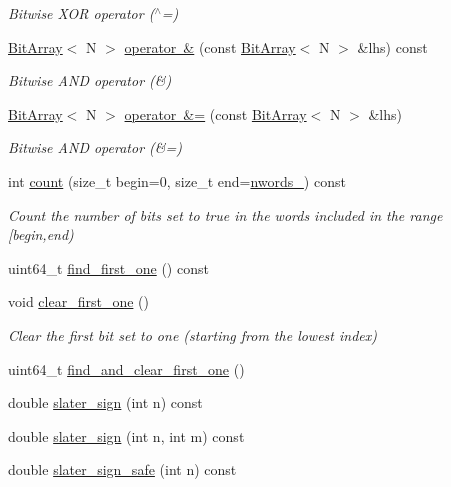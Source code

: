 \begin{DoxyCompactItemize}
\begin{DoxyCompactList}\small\item\em Bitwise X\+OR operator ($^\wedge$=) \end{DoxyCompactList}\item 
\mbox{\hyperlink{classforte_1_1_bit_array}{Bit\+Array}}$<$ N $>$ \mbox{\hyperlink{classforte_1_1_bit_array_ae3a8e53963f77e90db15dd25f3abe87a}{operator \&}} (const \mbox{\hyperlink{classforte_1_1_bit_array}{Bit\+Array}}$<$ N $>$ \&lhs) const
\begin{DoxyCompactList}\small\item\em Bitwise A\+ND operator (\&) \end{DoxyCompactList}\item 
\mbox{\hyperlink{classforte_1_1_bit_array}{Bit\+Array}}$<$ N $>$ \mbox{\hyperlink{classforte_1_1_bit_array_aaff16cc742d2f2af9dd32636310b17e3}{operator \&=}} (const \mbox{\hyperlink{classforte_1_1_bit_array}{Bit\+Array}}$<$ N $>$ \&lhs)
\begin{DoxyCompactList}\small\item\em Bitwise A\+ND operator (\&=) \end{DoxyCompactList}\item 
int \mbox{\hyperlink{classforte_1_1_bit_array_a96c011285fabafbfcdeed8ab23caafef}{count}} (size\+\_\+t begin=0, size\+\_\+t end=\mbox{\hyperlink{classforte_1_1_bit_array_aeaa8016f00f9ffc5822081f7e45656e8}{nwords\+\_\+}}) const
\begin{DoxyCompactList}\small\item\em Count the number of bits set to true in the words included in the range \mbox{[}begin,end) \end{DoxyCompactList}\item 
uint64\+\_\+t \mbox{\hyperlink{classforte_1_1_bit_array_a8097da916dcef4238671782f4b6e3e59}{find\+\_\+first\+\_\+one}} () const
\item 
void \mbox{\hyperlink{classforte_1_1_bit_array_ae8b38769188be526a5c7be0aeb2481df}{clear\+\_\+first\+\_\+one}} ()
\begin{DoxyCompactList}\small\item\em Clear the first bit set to one (starting from the lowest index) \end{DoxyCompactList}\item 
uint64\+\_\+t \mbox{\hyperlink{classforte_1_1_bit_array_a8485474d3cf2fc4c7ddca917e044e0bc}{find\+\_\+and\+\_\+clear\+\_\+first\+\_\+one}} ()
\item 
double \mbox{\hyperlink{classforte_1_1_bit_array_ad41338929f4ddb1ddb5c4e783e593645}{slater\+\_\+sign}} (int n) const
\item 
double \mbox{\hyperlink{classforte_1_1_bit_array_ae622441da06a5612addf552aeab89040}{slater\+\_\+sign}} (int n, int m) const
\item 
double \mbox{\hyperlink{classforte_1_1_bit_array_a0bb468ffa1f6aa5e95458ee63be391e9}{slater\+\_\+sign\+\_\+safe}} (int n) const
\end{DoxyCompactItemize}

